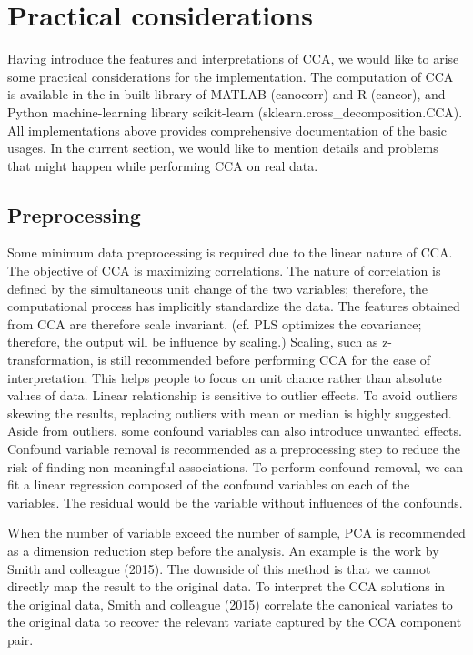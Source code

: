 

\section{Practical considerations}
\label{ch:methods:impliment}

Having introduce the features and interpretations of CCA, we would like to arise some practical considerations for the implementation. The computation of CCA is available in the in-built library of MATLAB (canocorr) and R (cancor), and Python machine-learning library scikit-learn (sklearn.cross\_decomposition.CCA). All implementations above provides comprehensive documentation of the basic usages. In the current section, we would like to mention details and problems that might happen while performing CCA on real data.

\subsection{Preprocessing}
Some minimum data preprocessing is required due to the linear nature of CCA. The objective of CCA is maximizing correlations. The nature of correlation is defined by the simultaneous unit change of the two variables; therefore, the computational process has implicitly standardize the data. The features obtained from CCA are therefore scale invariant.  (cf. PLS optimizes the covariance; therefore, the output will be influence by scaling.) Scaling, such as z-transformation, is still recommended before performing CCA for the ease of interpretation. This helps people to focus on unit chance rather than absolute values of data. Linear relationship is sensitive to outlier effects. To avoid outliers skewing the results, replacing outliers with mean or median is highly suggested. Aside from outliers, some confound variables can also introduce unwanted effects. Confound variable removal is recommended as a preprocessing step to reduce the risk of finding non-meaningful associations. To perform confound removal, we can fit a linear regression composed of the confound variables on each of the variables. The residual would be the variable without influences of the confounds.  

When the number of variable exceed the number of sample, PCA is recommended as a dimension reduction step before the analysis. An example is the work by Smith and colleague (2015). The downside of this method is that we cannot directly map the result to the original data. To interpret the CCA solutions in the original data, Smith and colleague (2015) correlate the canonical variates to the original data to recover the relevant variate captured by the CCA component pair. 


